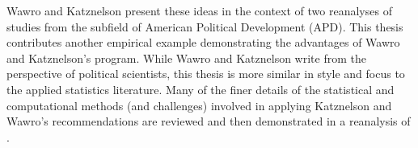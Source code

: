Wawro and Katznelson present these ideas in the context of two reanalyses of studies from the subfield of American Political Development (APD). This thesis contributes another empirical example demonstrating the advantages of Wawro and Katznelson's program. While Wawro and Katznelson write from the perspective of political scientists, this thesis is more similar in style and focus to the applied statistics literature. Many of the finer details of the statistical and computational methods (and challenges) involved in applying Katznelson and Wawro's recommendations are reviewed and then  demonstrated in a reanalysis of . 



